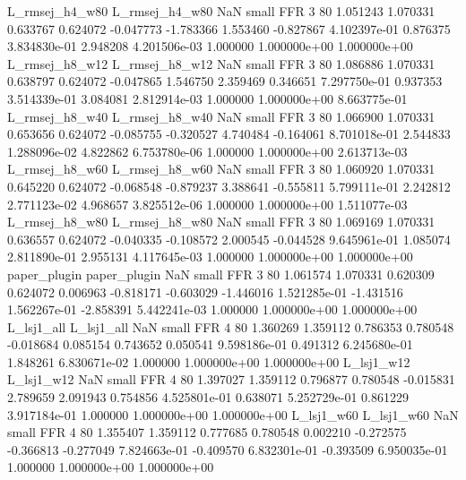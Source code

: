 L_rmsej_h4_w80 L_rmsej_h4_w80                   NaN      small      FFR                 3 80 1.051243       1.070331 0.633767       0.624072   -0.047773     -1.783366      1.553460    -0.827867   4.102397e-01  0.876375 3.834830e-01     2.948208   4.201506e-03            1.000000    1.000000e+00        1.000000e+00
L_rmsej_h8_w12 L_rmsej_h8_w12                   NaN      small      FFR                 3 80 1.086886       1.070331 0.638797       0.624072   -0.047865      1.546750      2.359469     0.346651   7.297750e-01  0.937353 3.514339e-01     3.084081   2.812914e-03            1.000000    1.000000e+00        8.663775e-01
L_rmsej_h8_w40 L_rmsej_h8_w40                   NaN      small      FFR                 3 80 1.066900       1.070331 0.653656       0.624072   -0.085755     -0.320527      4.740484    -0.164061   8.701018e-01  2.544833 1.288096e-02     4.822862   6.753780e-06            1.000000    1.000000e+00        2.613713e-03
L_rmsej_h8_w60 L_rmsej_h8_w60                   NaN      small      FFR                 3 80 1.060920       1.070331 0.645220       0.624072   -0.068548     -0.879237      3.388641    -0.555811   5.799111e-01  2.242812 2.771123e-02     4.968657   3.825512e-06            1.000000    1.000000e+00        1.511077e-03
L_rmsej_h8_w80 L_rmsej_h8_w80                   NaN      small      FFR                 3 80 1.069169       1.070331 0.636557       0.624072   -0.040335     -0.108572      2.000545    -0.044528   9.645961e-01  1.085074 2.811890e-01     2.955131   4.117645e-03            1.000000    1.000000e+00        1.000000e+00
  paper_plugin   paper_plugin                   NaN      small      FFR                 3 80 1.061574       1.070331 0.620309       0.624072    0.006963     -0.818171     -0.603029    -1.446016   1.521285e-01 -1.431516 1.562267e-01    -2.858391   5.442241e-03            1.000000    1.000000e+00        1.000000e+00
    L_lsj1_all     L_lsj1_all                   NaN      small      FFR                 4 80 1.360269       1.359112 0.786353       0.780548   -0.018684      0.085154      0.743652     0.050541   9.598186e-01  0.491312 6.245680e-01     1.848261   6.830671e-02            1.000000    1.000000e+00        1.000000e+00
    L_lsj1_w12     L_lsj1_w12                   NaN      small      FFR                 4 80 1.397027       1.359112 0.796877       0.780548   -0.015831      2.789659      2.091943     0.754856   4.525801e-01  0.638071 5.252729e-01     0.861229   3.917184e-01            1.000000    1.000000e+00        1.000000e+00
    L_lsj1_w60     L_lsj1_w60                   NaN      small      FFR                 4 80 1.355407       1.359112 0.777685       0.780548    0.002210     -0.272575     -0.366813    -0.277049   7.824663e-01 -0.409570 6.832301e-01    -0.393509   6.950035e-01            1.000000    1.000000e+00        1.000000e+00
